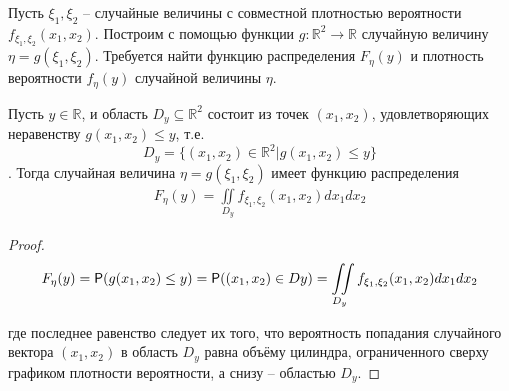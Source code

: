 \begin{zam}
\label{zam:16.1}
Пусть $\xi_1 , \xi_2$ -- случайные величины с совместной плотностью вероятности $f_{\xi_1 ,\xi_2} (x_1 , x_2 )$. Построим с помощью функции $g : \mathbb{R}^2 \to \mathbb{R}$ случайную величину $\eta = g(\xi_1 , \xi_2 )$. Требуется найти функцию распределения $F_\eta (y)$ и плотность вероятности $f_\eta (y)$ случайной величины $\eta$.
\end{zam}

\begin{lemma}
\label{lemma:16.2}

Пусть $y \in \mathbb{R}$, и область $D_y \subseteq \mathbb{R}^2$ состоит из точек $(x_1 , x_2 )$, удовлетворяющих неравенству $g(x_1 , x_2 ) \leq y$, т.е. $$D_y = \{(x_1 , x_2 ) \in \mathbb{R}^2 | g(x_1 , x_2 ) \leq y\}$$. Тогда случайная величина $\eta = g(\xi_1 , \xi_2 )$ имеет функцию распределения
\begin{gather*}
	F_\eta (y) = \iint\limits_{D_y}f_{\xi_1,\xi_2} (x_1 , x_2 ) dx_1 dx_2
\end{gather*}
\end{lemma}

\begin{proof}
\begin{gather*}
	F_\eta (y) = \P ( g(x_1 , x_2 ) \leq y ) = \P( (x_1 , x_2 ) \in Dy )= \iint\limits_{D_y}f_{\xi_1 ,\xi_2} (x_1 , x_2 ) dx_1 dx_2
\end{gather*}

где последнее равенство следует их того, что вероятность попадания случайного вектора $(x_1 , x_2 )$ в область $D_y$ равна объёму цилиндра, ограниченного сверху графиком плотности вероятности, а снизу -- областью $D_y$.
\end{proof}

